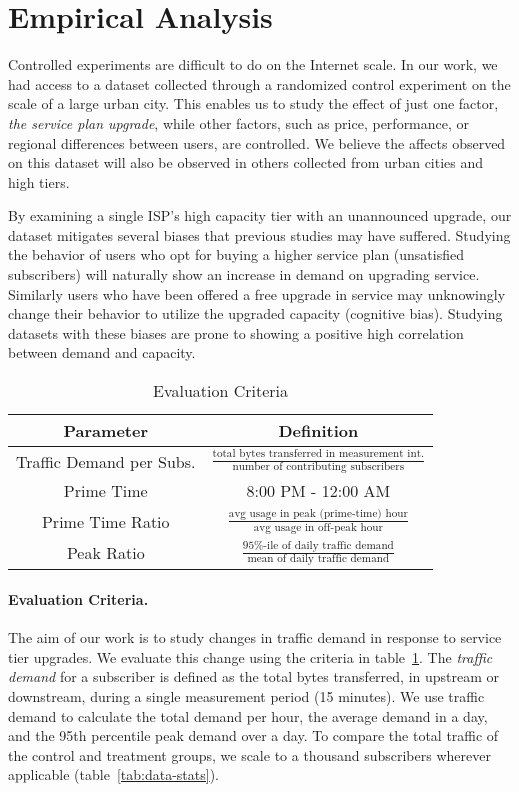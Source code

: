 \section{Empirical Analysis}\label{sec:analysis}

Controlled experiments are difficult to do on the Internet scale. In
our work, we had access to a dataset collected through a randomized control 
experiment on the scale of a large urban city. This enables us to study the effect of 
just one factor, \emph{the service plan upgrade}, while other
factors, such as price, performance, or regional differences between users, are
controlled. We believe the affects observed on this dataset will also
be observed in others collected from urban cities and high tiers.

By examining a single ISP's high capacity tier with an unannounced upgrade,
our dataset mitigates several biases that previous studies may have 
suffered. Studying the behavior of users who opt for buying a higher service plan
(unsatisfied subscribers) will naturally show an increase in demand on
upgrading service. Similarly users who have been offered a free upgrade in service
may unknowingly change their behavior to utilize the upgraded capacity
(cognitive bias). Studying datasets with these biases are prone 
to showing a positive high correlation between demand and capacity. 

\begin{table}[t]
\begin{tabular}{| c | c |}\hline
\textbf{Parameter} & \textbf{Definition}	\\\hline
Traffic Demand per Subs.& \(\frac{\text{total bytes transferred in 
measurement int.}}{\text{number of contributing subscribers}}\)	\\
Prime Time		& 8:00 PM - 12:00 AM   		\\
Prime Time Ratio 	& \( \frac{ \text{avg usage in peak (prime-time) 
hour}}{ \text{avg usage in off-peak hour}}\) 		\\
Peak Ratio 		& \(\frac{\text{95\%-ile of daily traffic 
demand}}{\text{mean of daily traffic demand}}\)	\\\hline
\end{tabular}
\caption{Evaluation Criteria}
\label{tab:eval-criteria}
\end{table}


\paragraph{Evaluation Criteria. } The aim of our work is to study changes in
traffic demand in response to service tier upgrades. We evaluate this
change using the criteria in table~\ref{tab:eval-criteria}. The \emph{traffic 
demand} for a subscriber is defined as the total bytes transferred, in 
upstream or downstream, during a single measurement period (15 minutes).
We use traffic demand to calculate the total demand per hour, the average demand 
in a day, and the 95th percentile peak demand over a day. To compare the total
traffic of the control and treatment groups, we scale to a thousand subscribers
wherever applicable (table~\ref{tab:data-stats}).

